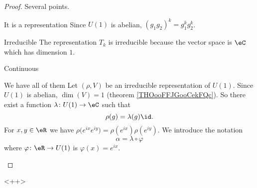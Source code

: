 \begin{proof}
    Several points.
    \begin{subproof}
        \item[It is a representation]
            Since \( U(1)\) is abelian, \( (g_1g_2)^k=g_1^kg_2^k\).
        \item[Irreducible]
            The representation \( T_k\) is irreducible because the vector space is \( \eC\) which has dimension \( 1\).
        \item[Continuous]
        \item[We have all of them]
            Let \( (\rho, V)\) be an irreducible representation of \( U(1)\). Since \( U(1)\) is abelian, \( \dim(V)=1\) (theorem \ref{THOooFFJGooCekFQc}). So there exist a function \( \lambda\colon U(1)\to \eC\) such that 
            \begin{equation}
                \rho(g)=\lambda(g)\id.
            \end{equation}
            For \( x,y\in \eR\) we have \( \rho\big(  e^{ix} e^{iy} \big)=\rho( e^{ix})\rho( e^{iy})\). We introduce the notation
            \begin{equation}
                \alpha=\lambda\circ\varphi
            \end{equation}
            where \( \varphi\colon \eR\to U(1)\) is \( \varphi(x)= e^{ix}\).
    \end{subproof}
\end{proof}
<++>
